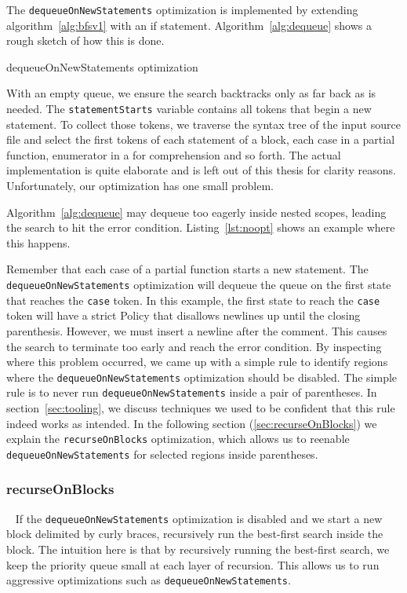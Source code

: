 The \texttt{dequeueOnNewStatements} optimization is implemented by extending algorithm~\ref{alg:bfsv1} with an if statement.
Algorithm~\ref{alg:dequeue} shows a rough sketch of how this is done.
\begin{algorithm}
\caption{dequeueOnNewStatements optimization}\label{alg:dequeue}
  
\end{algorithm}
With an empty queue, we ensure the search backtracks only as far back as is needed.
The \texttt{statementStarts} variable contains all tokens that begin a new statement.
To collect those tokens, we traverse the syntax tree of the input source file and select the first tokens of each statement of a block, each case in a partial function, enumerator in a for comprehension and so forth.
The actual implementation is quite elaborate and is left out of this thesis for clarity reasons.
Unfortunately, our optimization has one small problem.

Algorithm~\ref{alg:dequeue} may dequeue too eagerly inside nested scopes, leading the search to hit the error condition.
Listing~\ref{lst:noopt} shows an example where this happens.

Remember that each case of a partial function starts a new statement.
The \texttt{dequeueOnNewStatements} optimization will dequeue the queue on the first state that reaches the \texttt{case} token.
In this example, the first state to reach the \texttt{case} token will have a strict Policy that disallows newlines up until the closing parenthesis.
However, we must insert a newline after the comment.
This causes the search to terminate too early and reach the error condition.
By inspecting where this problem occurred, we came up with a simple rule to identify regions where the \texttt{dequeueOnNewStatements} optimization should be disabled.
The simple rule is to never run \texttt{dequeueOnNewStatements} inside a pair of parentheses.
In section~\ref{sec:tooling}, we discuss techniques we used to be confident that this rule indeed works as intended.
In the following section (\ref{sec:recurseOnBlocks}) we explain the \texttt{recurseOnBlocks} optimization, which allows us to reenable \texttt{dequeueOnNewStatements} for selected regions inside parentheses.

\subsubsection{recurseOnBlocks}~\label{sec:recurseOnBlocks}
If the \texttt{dequeueOnNewStatements} optimization is disabled and we start a new block delimited by curly braces, recursively run the best-first search inside the block.
The intuition here is that by recursively running the best-first search, we keep the priority queue small at each layer of recursion.
This allows us to run aggressive optimizations such as \texttt{dequeueOnNewStatements}.

